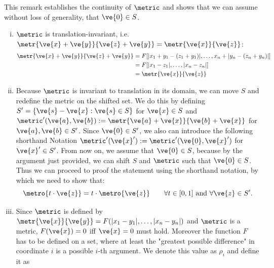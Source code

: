 \begin{rem} \label{lemma-rem}
  This remark establishes the continuity of $\metric$ and shows that we can assume without loss of generality, that $\ve{0} \in S$.
	\begin{enumerate}[(i)]
    \item $\metric$ is translation-invariant, i.e. $\metr{\ve{x}+\ve{y}}{\ve{z}+\ve{y}} = \metr{\ve{x}}{\ve{z}}$: \label{lemma-trans-invariance}
		      \begin{align*}
            \metr{\ve{x}+\ve{y}}{\ve{z}+\ve{y}} & = F[|x_1 + y_1 - (z_1 + y_1)|, \dots, x_n + |y_n - (z_n + y_n)|] \\
			                      & = F[|x_1 - z_1|, \dots, |x_n - z_n|]                             \\
                            & = \metr{\ve{x}}{\ve{z}}
		      \end{align*}
        \item Because $\metric$ is invariant to translation in its domain, we can move $S$ and redefine the metric on the shifted set. We do this by defining $S' = \{\ve{s} - \ve{x} : \ve{s} \in S\}$ for $\ve{x} \in S$ and $\metric'(\ve{a},\ve{b}) := \metr{\ve{a}+\ve{x}}{\ve{b}+\ve{x}}$ for $\ve{a}, \ve{b} \in S'$. Since $\ve{0} \in S'$, we also can introduce the following shorthand Notation $\metric'(\ve{x}') := \metric'(\ve{0}, \ve{x}')$ for $\ve{x}' \in S'$.
          From now on, we assume that $\ve{0} \in S$, because by the argument just provided, we can shift $S$ and $\metric$ such that $\ve{0} \in S$.
		      Thus we can proceed to proof the statement using the shorthand notation, by which we need to show that:
          $$ \metro{t \cdot  \ve{z}} = t \cdot \metro{\ve{z}} \qquad \forall t \in [0, 1] \text{ and } \forall \ve{z} \in S' .$$ \label{rem-lemma-translate-to-zero}
        \item Since $\metric$ is defined by $\metr{\ve{x}}{\ve{y}} = F(|x_1 - y_1|, \dots, |x_n - y_n|)$ and $\metric$ is a metric, $F(\ve{x}) = 0$ iff $\ve{x}=0$ must hold. Moreover the function $F$ has to be defined on a set, where at least the "greatest possible difference" in coordinate $i$ is a possible $i$-th argument. We denote this value as $\rho_i$ and define it as 

\end{enumerate}
\end{rem}
